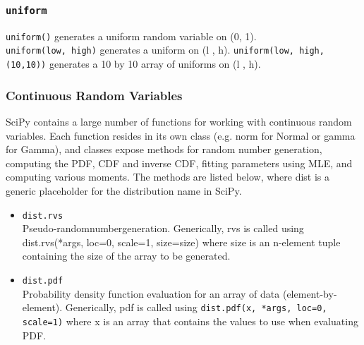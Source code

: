 \documentclass[MASTER.tex]{subfiles}
\begin{document}
\begin{frame}
	\frametitle{\texttt{uniform}}
	\texttt{uniform()} generates a uniform random variable on (0, 1). \\ \texttt{uniform(low, high)} generates a uniform on
	(l , h). \texttt{uniform(low, high, (10,10))} generates a 10 by 10 array of uniforms on (l , h).
	
\end{frame}
\begin{frame}
	\frametitle{Continuous Random Variables}
	
	SciPy contains a large number of functions for working with continuous random variables. Each function
	resides in its own class (e.g. norm for Normal or gamma for Gamma), and classes expose methods for random
	number generation, computing the PDF, CDF and inverse CDF, fitting parameters using MLE, and
	computing various moments. The methods are listed below, where dist is a generic placeholder for the
	distribution name in SciPy. 
\end{frame}
\begin{frame}
	\begin{itemize} 
		\item \texttt{dist.rvs}\\
		Pseudo-randomnumbergeneration. Generically, rvs is called using dist.rvs(*args, loc=0, scale=1, size=size)
		where size is an n-element tuple containing the size of the array to be generated.
		\item \texttt{dist.pdf}\\
		Probability density function evaluation for an array of data (element-by-element). Generically, pdf is
		called using \texttt{dist.pdf(x, *args, loc=0, scale=1)} where x is an array that contains the values to use when
		evaluating PDF.
	\end{itemize}
\end{frame}
\end{document}
